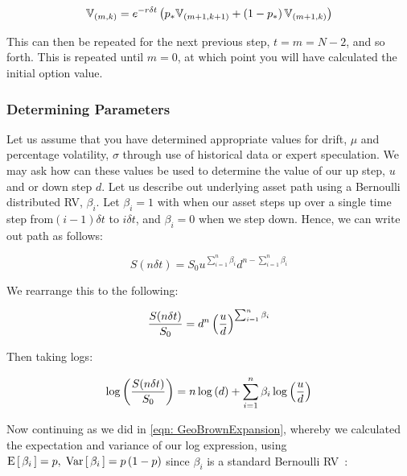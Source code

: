 \begin{equation}\label{eqn:c1:binomial method eqn}
    \mathbb{V}_{\left(m,k\right)} = e^{-r\delta t}\left(p_*\mathbb{V}_{\left(m+1,k+1\right)} + \left(1-p_*\right)\mathbb{V}_{\left(m+1,k\right)}\right)
\end{equation}

This can then be repeated for the next previous step, \(t = m = N-2\), and so forth. This is repeated until \(m = 0\), at which point you will have calculated the initial option value.

\subsubsection{Determining Parameters}

Let us assume that you have determined appropriate values for drift, \(\mu \) and percentage volatility, \(\sigma \) through use of historical data or expert speculation. We may ask how can these values be used to determine the value of our up step, \( u\) and or down step \(d \). 
\nline{}
Let us describe out underlying asset path using a Bernoulli distributed RV, \(\beta_i\). Let \(\beta_i = 1\) with when our asset steps up over a single time step from\((i-1)\delta t\) to \(i\delta t\), and \(\beta_i = 0\) when we step down. Hence, we can write out path as follows:

\begin{equation*}
    S(n\delta t) = S_0u^{\sum_{i=1}^n\beta_i}d^{n-\sum_{i=1}^n\beta_i}
\end{equation*}

We rearrange this to the following:

\begin{equation}
    \frac{S(n\delta t)}{S_0} = d^n\left(\frac{u}{d}\right)^{\sum_{i=1}^n\beta_i}
\end{equation}

Then taking logs:

\begin{equation*}
    \log\left(\frac{S(n\delta t)}{S_0}\right) = n\log\left(d\right) + \sum_{i=1}^n\beta_i\log\left(\frac{u}{d}\right)
\end{equation*}

Now continuing as we did in \autoref{eqn: GeoBrownExpansion}, whereby we calculated the expectation and variance of our log expression, using \(\text{E}\left[\,\beta_i\,\right] = p,\; \text{Var}\left[\,\beta_i\,\right] = p\left(1-p\right)\) since \(\beta_i\) is a standard Bernoulli RV~:

